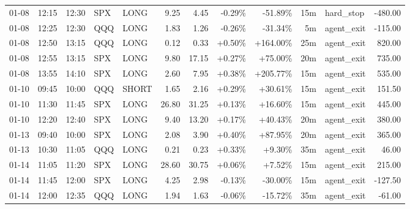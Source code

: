 \documentclass[11pt,a4paper]{article}
\begin{document}
\begin{center}
\begin{longtable}{>{\color{txtmain}}l l l l l r r r r r >{\color{txtmain}}l r}
01-08 & 12:15 & 12:30 & SPX & LONG & 9.25 & 4.45 & \textcolor{lossred}{-0.29\%} & \textcolor{lossred}{-51.89\%} & 15m & hard\_stop & \textcolor{lossred}{-480.00} \\
01-08 & 12:25 & 12:30 & QQQ & LONG & 1.83 & 1.26 & \textcolor{lossred}{-0.26\%} & \textcolor{lossred}{-31.34\%} & 5m & agent\_exit & \textcolor{lossred}{-115.00} \\
01-08 & 12:50 & 13:15 & QQQ & LONG & 0.12 & 0.33 & \textcolor{wingreen}{+0.50\%} & \textcolor{wingreen}{+164.00\%} & 25m & agent\_exit & \textcolor{wingreen}{820.00} \\
01-08 & 12:55 & 13:15 & SPX & LONG & 9.80 & 17.15 & \textcolor{wingreen}{+0.27\%} & \textcolor{wingreen}{+75.00\%} & 20m & agent\_exit & \textcolor{wingreen}{735.00} \\
01-08 & 13:55 & 14:10 & SPX & LONG & 2.60 & 7.95 & \textcolor{wingreen}{+0.38\%} & \textcolor{wingreen}{+205.77\%} & 15m & agent\_exit & \textcolor{wingreen}{535.00} \\
01-10 & 09:45 & 10:00 & QQQ & SHORT & 1.65 & 2.16 & \textcolor{wingreen}{+0.29\%} & \textcolor{wingreen}{+30.61\%} & 15m & agent\_exit & \textcolor{wingreen}{151.50} \\
01-10 & 11:30 & 11:45 & SPX & LONG & 26.80 & 31.25 & \textcolor{wingreen}{+0.13\%} & \textcolor{wingreen}{+16.60\%} & 15m & agent\_exit & \textcolor{wingreen}{445.00} \\
01-10 & 12:20 & 12:40 & SPX & LONG & 9.40 & 13.20 & \textcolor{wingreen}{+0.17\%} & \textcolor{wingreen}{+40.43\%} & 20m & agent\_exit & \textcolor{wingreen}{380.00} \\
01-13 & 09:40 & 10:00 & SPX & LONG & 2.08 & 3.90 & \textcolor{wingreen}{+0.40\%} & \textcolor{wingreen}{+87.95\%} & 20m & agent\_exit & \textcolor{wingreen}{365.00} \\
01-13 & 10:30 & 11:05 & QQQ & LONG & 0.21 & 0.23 & \textcolor{wingreen}{+0.33\%} & \textcolor{wingreen}{+9.30\%} & 35m & agent\_exit & \textcolor{wingreen}{46.00} \\
01-14 & 11:05 & 11:20 & SPX & LONG & 28.60 & 30.75 & \textcolor{wingreen}{+0.06\%} & \textcolor{wingreen}{+7.52\%} & 15m & agent\_exit & \textcolor{wingreen}{215.00} \\
01-14 & 11:45 & 12:00 & SPX & LONG & 4.25 & 2.98 & \textcolor{lossred}{-0.13\%} & \textcolor{lossred}{-30.00\%} & 15m & agent\_exit & \textcolor{lossred}{-127.50} \\
01-14 & 12:00 & 12:35 & QQQ & LONG & 1.94 & 1.63 & \textcolor{lossred}{-0.06\%} & \textcolor{lossred}{-15.72\%} & 35m & agent\_exit & \textcolor{lossred}{-61.00} \\

\end{longtable}
\end{center}
\end{document}

